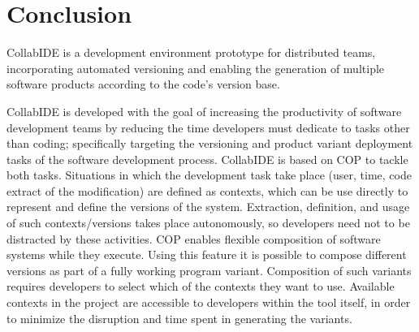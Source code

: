 
\section{Conclusion}
\label{sec:conclusion}

CollabIDE is a development environment prototype for distributed teams, incorporating automated 
versioning and enabling the generation of multiple software products according to the code's version
base.

CollabIDE is developed with the goal of increasing the productivity of software development teams by 
reducing the time developers must dedicate to tasks other than coding; specifically targeting the 
versioning and product variant deployment tasks of the software development process. CollabIDE is 
based on \ac{COP} to tackle both tasks. Situations in which the development task take place (\eg user, 
time, code extract of the modification) are defined as contexts, which can be use directly to represent 
and define the versions of the system. Extraction, definition, and usage of such contexts/versions takes 
place autonomously, so developers need not to be distracted by these activities. 
\ac{COP} enables flexible composition of software systems while they execute. Using this feature it is 
possible to compose different versions as part of a fully working program variant. Composition of such 
variants requires developers to select which of the contexts they want to use. Available contexts in the 
project are accessible to developers within the tool itself, in order to minimize the disruption and time 
spent in generating the variants.

